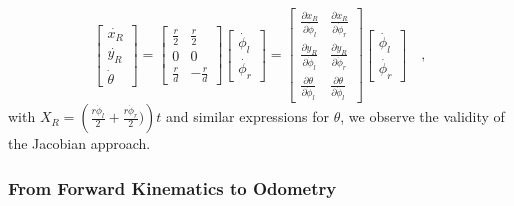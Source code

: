 \begin{equation}
\left[\begin{array}{c} \dot{x_R}\\\dot{y_R}\\\dot{\theta}\end{array}\right]=\left[\begin{array}{cc}
\frac{r}{2} & \frac{r}{2}\\
0 & 0 \\
\frac{r}{d} & -\frac{r}{d} \end{array}\right]
\left[\begin{array}{c}\dot{\phi_l}\\\dot{\phi_r}\end{array}\right]
=
\left[\begin{array}{cc}
\frac{\partial{x_R}}{\partial{\dot{\phi}_l}} & \frac{\partial{x_R}}{\partial{\dot{\phi}_r}}\\\frac{\partial{y_R}}{\partial{\dot{\phi}_l}} & \frac{\partial{y_R}}{\partial{\dot{\phi}_r}}\\\frac{\partial{\theta}}{\partial{\dot{\phi}_l}} & \frac{\partial{\theta}}{\partial{\dot{\phi}_l}} \end{array}\right]
\left[\begin{array}{c}
\dot{\phi_l}\\\dot{\phi_r}
\end{array}\right]\quad,
\end{equation}
with $X_R=\left(\frac{r\dot{\phi}_l}{2}+\frac{r\dot{\phi}_r}{2})\right)t$ and similar expressions for $\theta$, we observe the validity of the Jacobian approach.

\subsubsection{From Forward Kinematics to Odometry}


